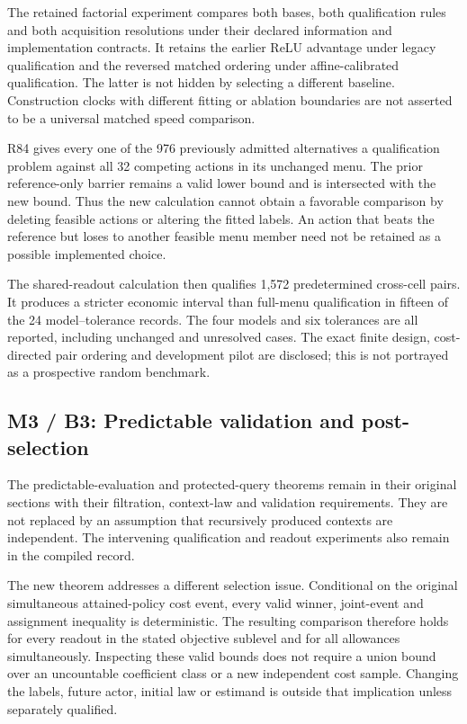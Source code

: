 \documentclass[ecta,nameyear,draft]{econsocart}
\begin{document}
The retained factorial experiment compares both bases, both
qualification rules and both acquisition resolutions under their
declared information and implementation contracts. It retains the
earlier ReLU advantage under legacy qualification and the reversed
matched ordering under affine-calibrated qualification. The latter is
not hidden by selecting a different baseline. Construction clocks with
different fitting or ablation boundaries are not asserted to be a
universal matched speed comparison.

R84 gives every one of the 976 previously admitted alternatives a
qualification problem against all 32 competing actions in its unchanged
menu. The prior reference-only barrier remains a valid lower bound and
is intersected with the new bound. Thus the new calculation cannot
obtain a favorable comparison by deleting feasible actions or altering
the fitted labels. An action that beats the reference but loses to
another feasible menu member need not be retained as a possible
implemented choice.

The shared-readout calculation then qualifies 1,572 predetermined
cross-cell pairs. It produces a stricter economic interval than
full-menu qualification in fifteen of the 24 model--tolerance records.
The four models and six tolerances are all reported, including unchanged
and unresolved cases. The exact finite design, cost-directed pair
ordering and development pilot are disclosed; this is not portrayed as a
prospective random benchmark.

\hypertarget{m3-b3-predictable-validation-and-post-selection}{%
\subsection{M3 / B3: Predictable validation and
post-selection}\label{m3-b3-predictable-validation-and-post-selection}}

The predictable-evaluation and protected-query theorems remain in their
original sections with their filtration, context-law and validation
requirements. They are not replaced by an assumption that recursively
produced contexts are independent. The intervening qualification and
readout experiments also remain in the compiled record.

The new theorem addresses a different selection issue. Conditional on
the original simultaneous attained-policy cost event, every valid
winner, joint-event and assignment inequality is deterministic. The
resulting comparison therefore holds for every readout in the stated
objective sublevel and for all allowances simultaneously. Inspecting
these valid bounds does not require a union bound over an uncountable
coefficient class or a new independent cost sample. Changing the labels,
future actor, initial law or estimand is outside that implication unless
separately qualified.
\end{document}
